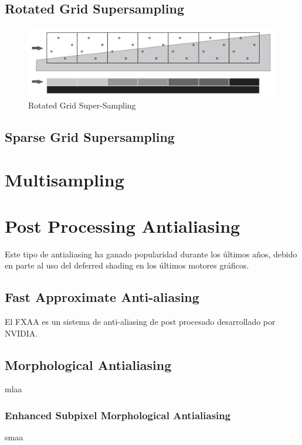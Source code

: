 \documentclass[withindex, glossary]{cam-thesis}
\begin{document}
\subsection{Rotated Grid Supersampling}

\begin{figure}
    \includegraphics[width=\linewidth]{figures/rgss.png}
    \caption{Rotated Grid Super-Sampling\cite{Beets2000SupersamplingAA}}
\end{figure}

\subsection{Sparse Grid Supersampling}

\section{Multisampling}

\section{Post Processing Antialiasing}

Este tipo de antialiasing ha ganado popularidad durante los últimos años, debido en parte al uso del deferred shading en los últimos motores gráficos.

\subsection{Fast Approximate Anti-aliasing}

El FXAA\cite{FXAA} es un sistema de anti-aliasing de post procesado desarrollado por NVIDIA.

\subsection{Morphological Antialiasing}
mlaa

\subsubsection{Enhanced Subpixel Morphological Antialiasing}
smaa
\end{document}
